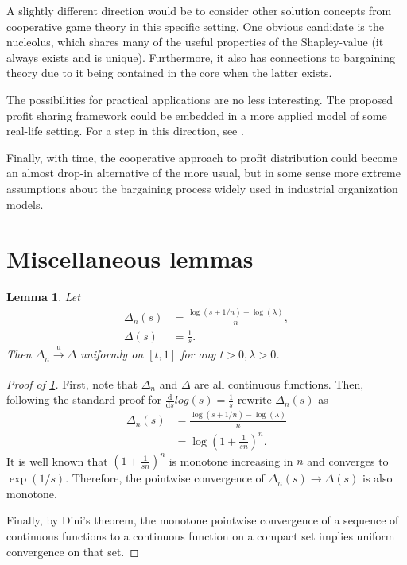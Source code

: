 \documentclass[a4paper]{article}
\newtheorem{lemma}{Lemma}
\begin{document}
A slightly different direction would be to consider other solution concepts from cooperative game theory in this specific setting.
One obvious candidate is the nucleolus, which shares many of the useful properties of the Shapley-value (it always exists and is unique).
Furthermore, it also has connections to bargaining theory due to it being contained in the core when the latter exists.

The possibilities for practical applications are no less interesting.
The proposed profit sharing framework could be embedded in a more applied model of some real-life setting.
For a step in this direction, see \textcite{stancsics2023hybrid}.

Finally, with time, the cooperative approach to profit distribution could become an almost drop-in alternative of the more usual, but in some sense more extreme assumptions about the bargaining process widely used in industrial organization models.


\appendix

\printbibliography

\section{Miscellaneous lemmas}

\begin{lemma}
    \label{lemma:log_convergence}
    Let 
    \begin{align*}
        \Delta_n(s) &= \frac{\log(s + 1/n) - \log(\lambda)}{n}, \\
        \Delta(s) &= \frac{1}{s}.
    \end{align*}
    Then $\Delta_n \xrightarrow[]{\mathrm{u}} \Delta$ uniformly on $[t, 1]$ for any $t > 0, \lambda > 0$.
\end{lemma}
\begin{proof}[Proof of \cref{lemma:log_convergence}]
    First, note that $\Delta_n$ and $\Delta$ are all continuous functions.
    Then, following the standard proof for $\frac{\mathrm{d}}{\mathrm{d}s}log(s) = \frac{1}{s}$ rewrite $\Delta_n(s)$ as
    \begin{align*}
        \Delta_n(s) &= \frac{\log(s + 1/n) - \log(\lambda)}{n} \\
        &= \log \left( 1 + \frac{1}{sn} \right) ^ n .
    \end{align*}
    It is well known that $\left( 1 + \frac{1}{sn} \right) ^ n$ is monotone increasing in $n$ and converges to $\exp (1/s)$.
    Therefore, the pointwise convergence of $\Delta_n(s) \to \Delta(s)$ is also monotone.

    Finally, by Dini's theorem, the monotone pointwise convergence of a sequence of continuous functions to a continuous function on a compact set implies uniform convergence on that set.
\end{proof}
\end{document}
